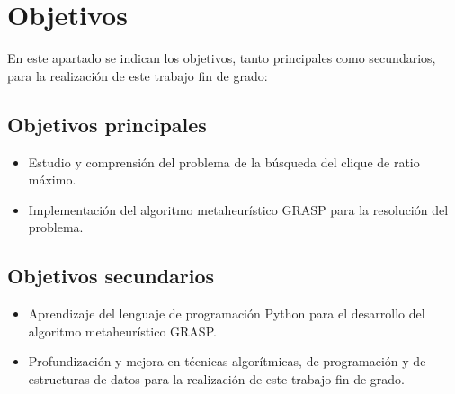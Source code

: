 
\chapter{Objetivos} %

\label{Chapter2}


En este apartado se indican los objetivos, tanto principales como secundarios, para la realización de este trabajo fin de grado:

\section{Objetivos principales}
\begin{itemize}
	\item Estudio y comprensión del problema de la búsqueda del clique de ratio máximo.
	\item Implementación del algoritmo metaheurístico GRASP para la resolución del problema.
\end{itemize}

\section{Objetivos secundarios}
\begin{itemize}
	\item Aprendizaje del lenguaje de programación Python para el desarrollo del algoritmo metaheurístico GRASP.
	\item Profundización y mejora en técnicas algorítmicas, de programación y de estructuras de datos para la realización de este trabajo fin de grado.
\end{itemize}

